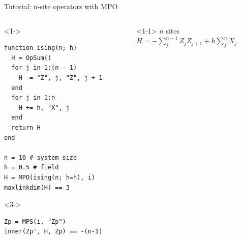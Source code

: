 \begin{frame}[fragile]{Tutorial: n-site operators with MPO}

\begin{columns}

\begin{column}{5cm}

\begin{onlyenv}<1->
\begin{lstlisting}[language=JuliaLocal, style=julia, mathescape, basicstyle=\scriptsize\ttfamily]
function ising(n; h)
  H = OpSum()
  for j in 1:(n - 1)
    H -= "Z", j, "Z", j + 1
  end
  for j in 1:n
    H += h, "X", j
  end
  return H
end

n = 10 # system size
h = 0.5 # field
H = MPO(ising(n; h=h), i)
maxlinkdim(H) == 3
\end{lstlisting}
\end{onlyenv}

\begin{onlyenv}<3->
\begin{lstlisting}[language=JuliaLocal, style=julia, mathescape, basicstyle=\scriptsize\ttfamily]
Zp = MPS(i, "Zp")
inner(Zp', H, Zp) == -(n-1)
 \end{lstlisting}
\end{onlyenv}

\end{column}

\begin{column}{5.5cm}

\begin{onlyenv}<1-1>
$n$ sites \\
$H = -\sum_j^{n-1} Z_j Z_{j+1} + h \sum_j^n X_j$ \\
~\\
~\\
~\\
~\\
~\\
~\\
~\\
~\\
\end{onlyenv}


\end{column}
\end{columns}
\end{frame}

